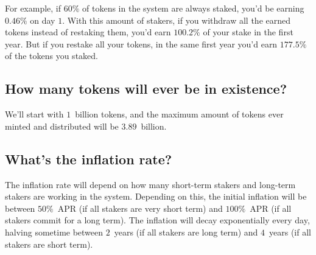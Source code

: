\documentclass[longbibliography,nofootinbib,twocolumn]{revtex4-1}
\begin{document}
For example, if $60\%$ of tokens in the system are always staked, you'd be earning $0.46\%$ on day $1$.
With this amount of stakers, if you withdraw all the earned tokens instead of restaking them, you'd earn $100.2\%$ of your stake in the first year.
But if you restake all your tokens, in the same first year you'd earn $177.5\%$ of the tokens you staked.

\subsection{How many tokens will ever be in existence?}
We'll start with $1$~billion tokens, and the maximum amount of tokens ever minted and distributed will be $3.89$~billion.

\subsection{What's the inflation rate?}
The inflation rate will depend on how many short-term stakers and long-term stakers are working in the system.
Depending on this, the initial inflation will be between $50\%$~APR (if all stakers are very short term) and $100\%$~APR (if all stakers commit for a long
term).
The inflation will decay exponentially every day, halving sometime between $2$~years (if all stakers are long term)
and $4$~years (if all stakers are short term).


\end{document}
